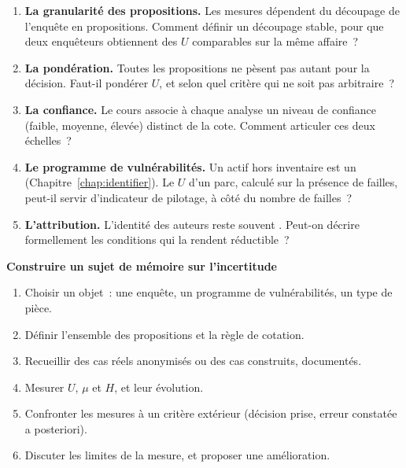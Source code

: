 \begin{enumerate}
    \item \textbf{La granularité des propositions.} Les mesures dépendent du
          découpage de l'enquête en propositions. Comment définir un
          découpage stable, pour que deux enquêteurs obtiennent des $U$
          comparables sur la même affaire~?
    \item \textbf{La pondération.} Toutes les propositions ne pèsent pas
          autant pour la décision. Faut-il pondérer $U$, et selon quel
          critère qui ne soit pas arbitraire~?
    \item \textbf{La confiance.} Le cours associe à chaque analyse un niveau
          de confiance (faible, moyenne, élevée) distinct de la cote. Comment
          articuler ces deux échelles~?
    \item \textbf{Le programme de vulnérabilités.} Un actif hors inventaire
          est un \NEK{} (Chapitre~\ref{chap:identifier}). Le $U$ d'un parc,
          calculé sur la présence de failles, peut-il servir d'indicateur de
          pilotage, à côté du nombre de failles~?
    \item \textbf{L'attribution.} L'identité des auteurs reste souvent
          \NEK{}. Peut-on décrire formellement les conditions qui la rendent
          réductible~?
\end{enumerate}

\begin{boxinfo}
\textbf{Construire un sujet de mémoire sur l'incertitude}
\begin{enumerate}
    \item Choisir un objet~: une enquête, un programme de vulnérabilités,
          un type de pièce.
    \item Définir l'ensemble des propositions et la règle de cotation.
    \item Recueillir des cas réels anonymisés ou des cas construits,
          documentés.
    \item Mesurer $U$, $\mu$ et $H$, et leur évolution.
    \item Confronter les mesures à un critère extérieur (décision prise,
          erreur constatée a posteriori).
    \item Discuter les limites de la mesure, et proposer une amélioration.
\end{enumerate}
\end{boxinfo}

